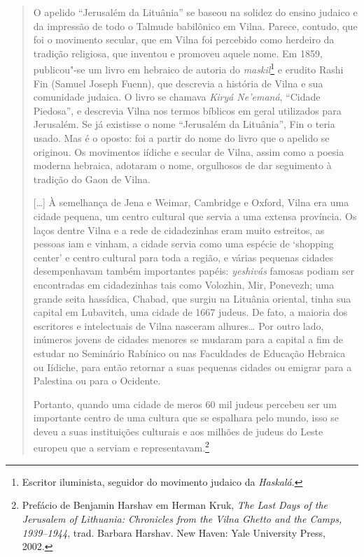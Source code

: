\begin{quote}
O apelido ``Jerusalém da Lituânia'' se baseou na solidez do ensino
judaico e da impressão de todo o Talmude babilônico em Vilna. Parece,
contudo, que foi o movimento secular, que em Vilna foi percebido como
herdeiro da tradição religiosa, que inventou e promoveu aquele nome. Em
1859, publicou"-se um livro em hebraico de autoria do \textit{maskil}\footnote{Escritor
iluminista, seguidor do movimento judaico da \textit{Haskalá}.} e erudito Rashi Fin (Samuel Joseph Fuenn), que descrevia a
história de Vilna e sua comunidade judaica. O livro se chamava \textit{Kiryá
Ne'emaná}, ``Cidade Piedosa'', e descrevia Vilna nos termos bíblicos em
geral utilizados para Jerusalém. Se já existisse o nome ``Jerusalém da
Lituânia'', Fin o teria usado. Mas é o oposto: foi a partir do nome do
livro que o apelido se originou. Os movimentos iídiche e secular de
Vilna, assim como a poesia moderna hebraica, adotaram o nome, orgulhosos
de dar seguimento à tradição do Gaon de Vilna.

[\ldots{}] À semelhança de Jena e Weimar, Cambridge e Oxford, Vilna era
uma cidade pequena, um centro cultural que servia a uma extensa
província. Os laços dentre Vilna e a rede de cidadezinhas eram muito
estreitos, as pessoas iam e vinham, a cidade servia como uma espécie de
`shopping center' e centro cultural para toda a região, e várias
pequenas cidades desempenhavam também importantes papéis: \textit{yeshivás}
famosas podiam ser encontradas em cidadezinhas tais como Volozhin, Mir,
Ponevezh; uma grande seita hassídica, Chabad, que surgiu na Lituânia
oriental, tinha sua capital em Lubavitch, uma cidade de 1667 judeus. De
fato, a maioria dos escritores e intelectuais de Vilna nasceram
alhures\ldots{} Por outro lado, inúmeros jovens de cidades menores se
mudaram para a capital a fim de estudar no Seminário Rabínico ou nas
Faculdades de Educação Hebraica ou Iídiche, para então retornar a suas
pequenas cidades ou emigrar para a Palestina ou para o Ocidente.

Portanto, quando uma cidade de meros 60 mil judeus percebeu ser um
importante centro de uma cultura que se espalhara pelo mundo, isso se
deveu a suas instituições culturais e aos milhões de judeus do Leste
europeu que a serviam e representavam.\footnote{Prefácio de Benjamin Harshav em Herman Kruk, \textit{The Last Days of the Jerusalem of Lithuania: Chronicles from the Vilna Ghetto and the Camps, 1939--1944}, trad. Barbara Harshav. New Haven: Yale University Press, 2002.} 
\end{quote}

